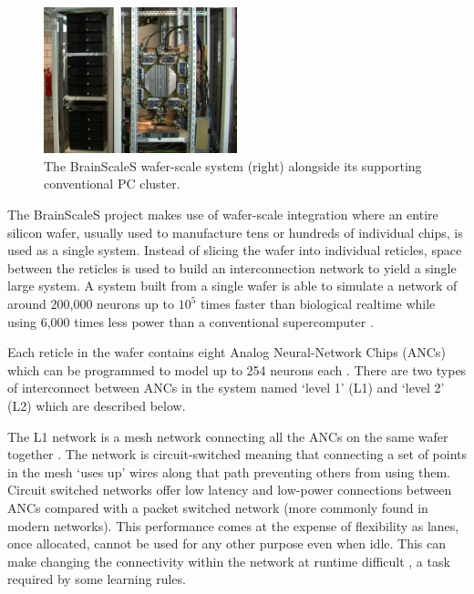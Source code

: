 				\begin{figure}
					\center
					\includegraphics[width=0.5\textwidth]{figures/brainscales}
					
					\caption[The BrainScaleS wafer-scale system.]{The BrainScaleS
					wafer-scale system (right) alongside its supporting conventional PC cluster.}
					
					\label{fig:brainscales}
				\end{figure}
				
				The BrainScaleS project makes use of wafer-scale integration where an
				entire silicon wafer, usually used to manufacture tens or hundreds of
				individual chips, is used as a single system. Instead of slicing the
				wafer into individual reticles, space between the reticles is used to
				build an interconnection network to yield a single large system. A
				system built from a single wafer is able to simulate a network of around
				200,000 neurons up to $10^5$ times faster than biological realtime
				while using 6,000 times less power than a conventional supercomputer
				\cite{schemmel08}.
				
				Each reticle in the wafer contains eight Analog Neural-Network Chips
				(ANCs) which can be programmed to model up to 254 neurons each
				\cite{schemmel10}. There are two types of interconnect between ANCs in
				the system named `level 1' (L1) and `level 2' (L2) which are described
				below.
			
				The L1 network is a mesh network connecting all the ANCs on the same
				wafer together \cite{fieres08}. The network is circuit-switched meaning
				that connecting a set of points in the mesh `uses up' wires along that
				path preventing others from using them. Circuit switched networks offer
				low latency and low-power connections between ANCs compared with a
				packet switched network (more commonly found in modern networks). This
				performance comes at the expense of flexibility as lanes, once
				allocated, cannot be used for any other purpose even when idle. This can
				make changing the connectivity within the network at runtime difficult
				\cite{dally04}, a task required by some learning rules.
				
